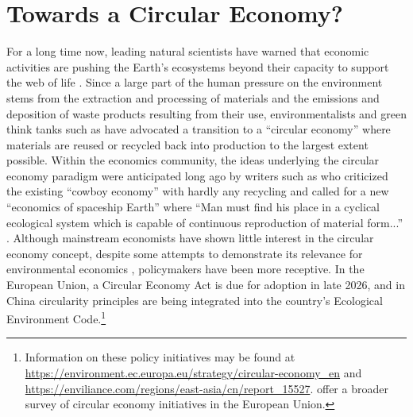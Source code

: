 \section{Towards a Circular Economy?}
\label{sec:introduction}

For a long time now, leading natural scientists have warned that economic activities are pushing the Earth's ecosystems beyond their capacity to support the web of life \parencite{kendall1992,rockstrom2009,ripple2017,richardson2024}. Since a large part of the human pressure on the environment stems from the extraction and processing of materials and the emissions and deposition of waste products resulting from their use, environmentalists and green think tanks such as \textcite{ellenmacarthur2012} have advocated a transition to a ``circular economy'' where materials are reused or recycled back into production to the largest extent possible. Within the economics community, the ideas underlying the circular economy paradigm were anticipated long ago by writers such as \textcite{boulding1966} who criticized the existing ``cowboy economy'' with hardly any recycling and called for a new ``economics of spaceship Earth'' where ``Man must find his place in a cyclical ecological system which is capable of continuous reproduction of material form...'' \parencite[p.~7]{boulding1966}. Although mainstream economists have shown little interest in the circular economy concept, despite some attempts to demonstrate its relevance for environmental economics \parencite[e.g.,][]{sorensen2018,fullerton2022}, policymakers have been more receptive. In the European Union, a Circular Economy Act is due for adoption in late 2026, and in China circularity principles are being integrated into the country's Ecological Environment Code.\footnote{Information on these policy initiatives may be found at \url{https://environment.ec.europa.eu/strategy/circular-economy_en} and \url{https://enviliance.com/regions/east-asia/cn/report_15527}. \textcite{mhatre2021} offer a broader survey of circular economy initiatives in the European Union.}

